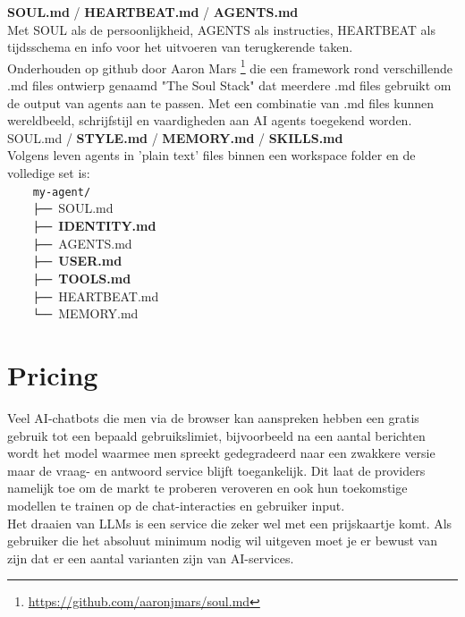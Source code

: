 \textbf{SOUL.md} / \textbf{HEARTBEAT.md} / \textbf{AGENTS.md} \\

Met SOUL als de persoonlijkheid, AGENTS als instructies, HEARTBEAT als tijdsschema en info voor het uitvoeren van terugkerende taken. \\

Onderhouden op github door Aaron Mars \footnote{\href{https://github.com/aaronjmars/soul.md}{https://github.com/aaronjmars/soul.md}} die een framework rond verschillende .md files ontwierp genaamd "The Soul Stack" dat meerdere .md files gebruikt om de output van agents aan te passen. Met een combinatie van .md files kunnen wereldbeeld, schrijfstijl en vaardigheden aan AI agents toegekend worden. \\

SOUL.md / \textbf{STYLE.md} / \textbf{MEMORY.md} / \textbf{SKILLS.md} \\

Volgens \textcite{Capodieci2026} leven agents in 'plain text' files binnen een workspace folder en de volledige set is: \\

\verb|    my-agent/| \\
\verb|    ├── |SOUL.md \\
\verb|    ├── |\textbf{IDENTITY.md} \\
\verb|    ├── |AGENTS.md \\
\verb|    ├── |\textbf{USER.md} \\
\verb|    ├── |\textbf{TOOLS.md} \\
\verb|    ├── |HEARTBEAT.md \\
\verb|    └── |MEMORY.md \\

\section{Pricing}
\label{sec:pricing}
%
Veel AI-chatbots die men via de browser kan aanspreken hebben een gratis gebruik tot een bepaald gebruikslimiet, bijvoorbeeld na een aantal berichten wordt het model waarmee men spreekt gedegradeerd naar een zwakkere versie maar de vraag- en antwoord service blijft toegankelijk. Dit laat de providers namelijk toe om de markt te proberen veroveren en ook hun toekomstige modellen te trainen op de chat-interacties en gebruiker input. \\

Het draaien van LLMs is een service die zeker wel met een prijskaartje komt. Als gebruiker die het absoluut minimum nodig wil uitgeven moet je er bewust van zijn dat er een aantal varianten zijn van AI-services. \\

